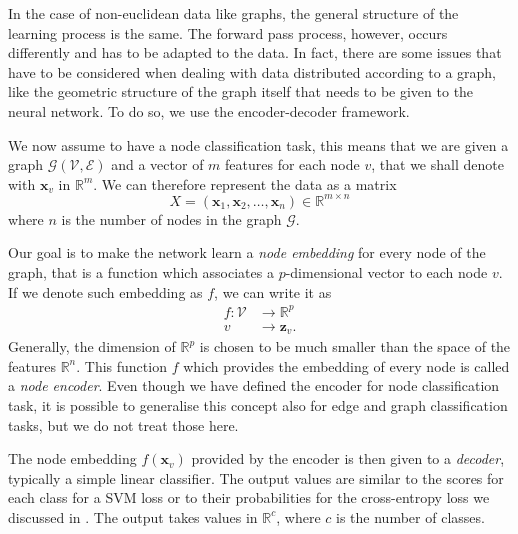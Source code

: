 \documentclass[12pt,a4paper]{report}
\theoremstyle{definition}
\begin{document}
In the case of non-euclidean data like graphs, the general structure of the learning process is the same.
The forward pass process, however, occurs differently and has to be adapted to the data.
In fact, there are some issues that have to be considered when dealing with data distributed according to a graph, like the geometric structure of the graph itself that needs to be given to the neural network.
To do so, we use the encoder-decoder framework.

We now assume to have a node classification task, this means that we are given a graph $\mathcal{G}(\mathcal{V}, \mathcal{E})$ and a vector of $m$ features for each node $v$, that we shall denote with $\mathbf{x}_v$ in $\mathbb{R}^m$.
We can therefore represent the data as a matrix
\begin{equation*}
    X = ( \mathbf{x}_1, \mathbf{x}_2, \ldots ,\mathbf{x}_n) \in \mathbb{R}^{m \times n}
\end{equation*}
where $n$ is the number of nodes in the graph $\mathcal{G}$.

Our goal is to make the network learn a \emph{node embedding} for every node of the graph, that is a function which associates a $p$-dimensional vector to each node $v$.
If we denote such embedding as $f$, we can write it as
\begin{align*}
    f : \mathcal{V} &\longrightarrow \mathbb{R}^p \\
    v &\longrightarrow \mathbf{z}_v .
\end{align*}
Generally, the dimension of $\mathbb{R}^p$ is chosen to be much smaller than the space of the features $\mathbb{R}^n$.
This function $f$ which provides the embedding of every node is called a \emph{node encoder}.
Even though we have defined the encoder for node classification task, it is possible to generalise this concept also for edge and graph classification tasks, but we do not treat those here.


The node embedding $f(\textbf{x}_v)$ provided by the encoder is then given to a \emph{decoder}, typically a simple linear classifier.
The output values are similar to the scores for each class for a SVM loss or to their probabilities for the cross-entropy loss we discussed in .
The output takes values in $\mathbb{R}^c$, where $c$ is the number of classes.
\end{document}
